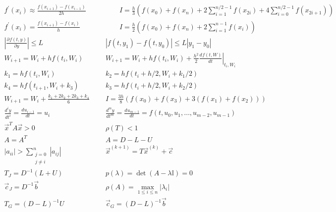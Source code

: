 \documentclass[12pt]{article}
\newcommand{\I}{\ensuremath{\mathbb{I}}}
\newcommand{\diff}[3]{\frac{d^{#3} #1}{d#2^{#3}}}
\newcommand{\pdiff}[3]{\frac{\partial^{#3} #1}{\partial #2^{#3}}}
\newcommand{\abs}[1]{\left| #1 \right|}
\begin{document}
\[
\begin{array}{cc}
f^\prime(x_i) \approx \frac{f(x_{i+1}) - f(x_{i-1})}{2h} \qquad & \qquad
I = \frac{h}{3}\left( f(x_0) + f(x_n) + 2\sum\limits_{i=1}^{n/2-1}f(x_{2i}) + 4\sum\limits_{i=0}^{n/2-1}f(x_{2i+1}) \right) \\
f^\prime(x_i) = \frac{f(x_{i+1})-f(x_i)}{h} \qquad & \qquad
I = \frac{h}{2}\left( f(x_0) + f(x_n) + 2\sum\limits_{i = 1}^{n-1}f(x_i)\right) \\
\abs{\pdiff{f(t,y)}{y}{}} \leq L & \abs{f(t, y_1) -f(t, y_0)} \leq L\abs{y_1 - y_0}\\
W_{i+1} = W_i + h f(t_i,W_i) & W_{i+1} = W_i + h f(t_i,W_i) + \frac{h^2}{2} \left.\diff{f(t,W)}{t}{} \right|_{t_i, W_i} \\
k_1  =  h f(t_i,W_i) & k_2  =  h f(t_i+h/2,W_i + k_1/2) \\
k_4  =  h f(t_{i+1},W_i + k_3) & k_3  =  h f(t_i+h/2,W_i + k_2/2)\\
 W_{i+1} = W_i + \frac{k_1+2k_2+2k_3+k_4}{6} & I = \frac{3h}{8}\left(f(x_0) + f(x_3) + 3\left(f(x_1) + f(x_2) \right) \right) \\
\diff{y}{t}{i} = \diff{u_{i-1}}{t}{} = u_i & \diff{y}{t}{m} = \diff{u_{m-1}}{t}{} = f(t, u_0, u_1, \ldots, u_{m-2}, u_{m-1})\\
\vec{x}^TA\vec{x} > 0 & \rho(T) < 1 \\
A = A^T & A = D - L - U\\
|a_{ii}| > \sum\limits_{\substack{j=0\\j\neq i}}^n |a_{ij}| & \vec{x}^{(k+1)} = T\vec{x}^{(k)} + \vec{c}\\
T_J = D^{-1}(L+U) & p(\lambda) = \det(A-\lambda \I) = 0\\
\vec{c}_J = D^{-1}\vec{b} & \rho(A) = \max\limits_{1\leq i\leq n}|\lambda_i|\\
T_G = (D-L)^{-1}U & \vec{c}_G = (D-L)^{-1}\vec{b}
\end{array}
\]
\end{document}
